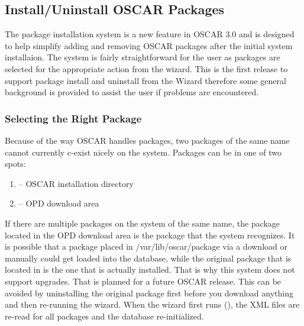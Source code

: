 \begchange
\subsection{Install/Uninstall OSCAR Packages}
\label{det:install-uninstall-packages}

The package installation system is a new feature in OSCAR 3.0 and is
designed to help simplify adding and removing OSCAR packages after the
initial system installaion.  The system is fairly straightforward for the
user as packages are selected for the appropriate action from the wizard.
This is the first release to support package install and uninstall from the
Wizard therefore some general background is provided to assist the user if
problems are encountered.

\subsubsection{Selecting the Right Package}
\label{det:select-package}

Because of the way OSCAR handles packages, two packages of the same name
cannot currently c-exist nicely on the system.  Packages can be in one of
two spots:

\begin{enumerate}

\item {} -- OSCAR installation directory
\item {} -- OPD download area

\end{enumerate}

If there are multiple packages on the system of the same name, the package
located in the OPD download area is the package that the system recognizes.
It is possible that a package placed in /var/lib/oscar/package via a download
or manually could get loaded into the database, while the original package
that is located in  is the one that is actually
installed.  That is why this system does not support upgrades.  That is
planned for a future OSCAR release.  This can be avoided by uninstalling the
original package first before you download anything and then re-running the
wizard.  When the wizard first runs (), the
XML files are re-read for all packages and the database re-initialized.

